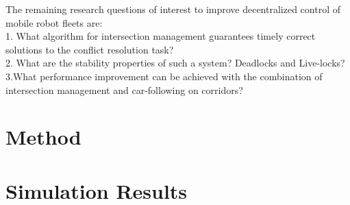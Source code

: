 \documentclass[runningheads]{llncs}
\begin{document}
The remaining research questions of interest to improve decentralized control of mobile robot fleets are:\\
1. What algorithm for intersection management guarantees timely correct solutions to the conflict resolution task?\\
2. What are the stability properties of such a system? Deadlocks and Live-locks?\\
3.What performance improvement can be achieved with the combination of intersection management and car-following on corridors?









\section{Method}
\section{Simulation Results}
\end{document}
